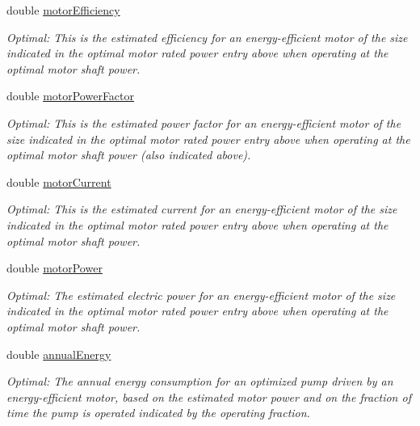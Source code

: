 \begin{DoxyCompactItemize}
double \hyperlink{struct_p_s_a_t_result_1_1_result_ad995bfd4c4d8372c99721d3fb43f1919}{motor\+Efficiency}
\begin{DoxyCompactList}\small\item\em Optimal\+: This is the estimated efficiency for an energy-\/efficient motor of the size indicated in the optimal motor rated power entry above when operating at the optimal motor shaft power. \end{DoxyCompactList}\item 
double \hyperlink{struct_p_s_a_t_result_1_1_result_a19ac96991a81b7c4e69b5b37bf05c460}{motor\+Power\+Factor}
\begin{DoxyCompactList}\small\item\em Optimal\+: This is the estimated power factor for an energy-\/efficient motor of the size indicated in the optimal motor rated power entry above when operating at the optimal motor shaft power (also indicated above). \end{DoxyCompactList}\item 
double \hyperlink{struct_p_s_a_t_result_1_1_result_a49d9fcc148cd66e507b918dea7435f1d}{motor\+Current}
\begin{DoxyCompactList}\small\item\em Optimal\+: This is the estimated current for an energy-\/efficient motor of the size indicated in the optimal motor rated power entry above when operating at the optimal motor shaft power. \end{DoxyCompactList}\item 
double \hyperlink{struct_p_s_a_t_result_1_1_result_ad51cbcc62a9515f5ffe119acbb4a4232}{motor\+Power}
\begin{DoxyCompactList}\small\item\em Optimal\+: The estimated electric power for an energy-\/efficient motor of the size indicated in the optimal motor rated power entry above when operating at the optimal motor shaft power. \end{DoxyCompactList}\item 
double \hyperlink{struct_p_s_a_t_result_1_1_result_aadbf128fb74140ef7117fbac7d3f16e5}{annual\+Energy}
\begin{DoxyCompactList}\small\item\em Optimal\+: The annual energy consumption for an optimized pump driven by an energy-\/efficient motor, based on the estimated motor power and on the fraction of time the pump is operated indicated by the operating fraction. \end{DoxyCompactList}\item 

\end{DoxyCompactItemize}

